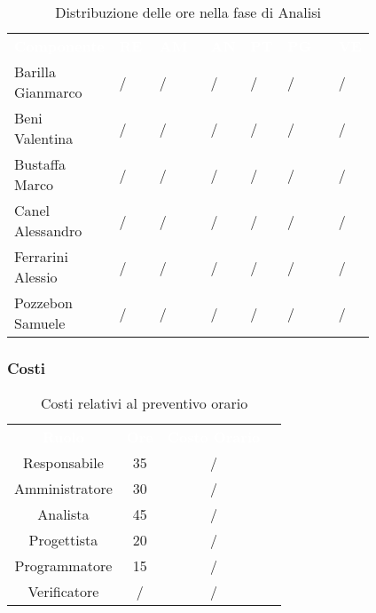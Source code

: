 \begin{table}[htb]
    \centering
    {\renewcommand{\arraystretch}{1.5}
    \scriptsize
    \begin{tabular}{p{0.15\linewidth}p{0.11\linewidth}p{0.14\linewidth}p{0.08\linewidth}p{0.09\linewidth}p{0.14\linewidth}p{0.10\linewidth}}
	    \rowcolor[RGB]{33, 73, 50}
	    \textcolor{white}{\textbf{Componente}} & \textcolor{white}{\textbf{RE}} & \textcolor{white}
	    {\textbf{AM}} & \textcolor{white}{\textbf{AN}} & \textcolor{white}
	    {\textbf{PT}} & \textcolor{white}{\textbf{PG}} & \textcolor{white}{\textbf{VE}}\\
	    \rowcolor[RGB]{216, 235, 171}
	    Barilla Gianmarco & / & / & / & / & / & /		\\
	    \rowcolor[RGB]{233, 245, 206}
	    Beni Valentina & / & / & / & / & / & /		\\
	    \rowcolor[RGB]{216, 235, 171}
	    Bustaffa Marco & / & / & / & / & / & /		\\
        \rowcolor[RGB]{233, 245, 206}
	    Canel Alessandro & / & / & / & / & / & /		\\
        \rowcolor[RGB]{216, 235, 171}
	    Ferrarini Alessio & / & / & / & / & / & /		\\
        \rowcolor[RGB]{233, 245, 206}
	    Pozzebon Samuele & / & / & / & / & / & /		\\
    \end{tabular}	
}
\caption{Distribuzione delle ore nella fase di Analisi}
\end{table}

\newpage
\subsubsection{Costi}

\begin{table}[htb]
    \centering
    {\renewcommand{\arraystretch}{1.5}
    \begin{tabular}{cccc}
	    \rowcolor[RGB]{33, 73, 50}
	    \textcolor{white}{\textbf{Ruolo}} & \textcolor{white}{\textbf{Ore}} & \textcolor{white}{\textbf{Costo Orario}}\\
	    \rowcolor[RGB]{216, 235, 171}
	    Responsabile & 35 & /\\
	    \rowcolor[RGB]{233, 245, 206}
	    Amministratore & 30 & /\\
        \rowcolor[RGB]{216, 235, 171}
	    Analista & 45 & /\\
	    \rowcolor[RGB]{233, 245, 206}
	    Progettista & 20 & /\\
        \rowcolor[RGB]{216, 235, 171}
	    Programmatore & 15 & /\\
	    \rowcolor[RGB]{233, 245, 206}
	    Verificatore & / & /\\
    \end{tabular}	
    }
\caption{Costi relativi al preventivo orario}
\end{table}